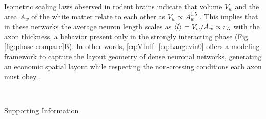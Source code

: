 \documentclass[linenumbers,endfloats,nofootinbib,preprint,floatfix,titlepage,superscriptaddress]{revtex4-1} %
\newcommand{\finV}[2]{#1}
\begin{document}
Isometric scaling laws observed in rodent brains \cite{herculano2012remarkable} indicate that volume $V_w$ and the area $A_w$ of the white matter relate to each other as $V_w\propto A_w^{1.5}$ \cite{herculano2012remarkable}. 
This implies that in these networks the average neuron length scales as $ \left<l\right> = V_w/A_w \propto r_L $ with the axon thickness, a behavior present only in the strongly interacting phase %
(Fig. \ref{fig:phase-compare}B). 
In other words,  \eqref{eq:Vfull}--\eqref{eq:Langevin0} offers a modeling framework to capture the layout geometry of dense neuronal networks, generating an economic spatial layout %
\cite{bullmore2012economy,sporns2004organization} while respecting the non-crossing conditions each axon must obey \cite{kasthuri12015saturated}.


% 
% 


\finV{


}{}

\newpage
\newpage




~
\newpage


\renewcommand{\thesection}{SI \arabic{section}}
\setcounter{page}{1}
\setcounter{figure}{0}
\centerline{\Huge Supporting Information}
\end{document}
